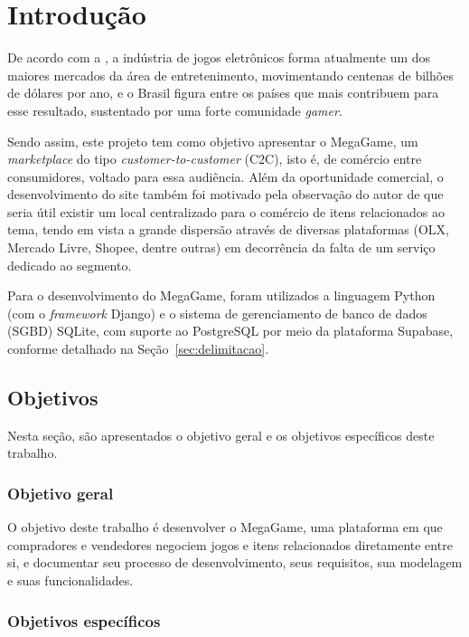\documentclass[
  12pt,
  a4paper,
  oneside,
  chapter=TITLE,
  subsection=TITLE,
  sumario=abnt-6027-2012,
  english,
  brazil
]{abntex2}
\begin{document}
\chapter{Introdução}

De acordo com a , a indústria de jogos
eletrônicos forma atualmente um dos maiores mercados da área de
entretenimento, movimentando centenas de bilhões de dólares por ano, e
o Brasil figura entre os países que mais contribuem para esse
resultado, sustentado por uma forte comunidade \emph{gamer}.

Sendo assim, este projeto tem como objetivo apresentar o MegaGame, um
\emph{marketplace} do tipo \emph{customer-to-customer} (C2C), isto é, de
comércio entre consumidores, voltado para essa audiência.
Além da oportunidade comercial, o desenvolvimento do site também foi
motivado pela observação do autor de que seria útil existir um local
centralizado para o comércio de itens relacionados ao tema, tendo em
vista a grande dispersão através de diversas plataformas (OLX, Mercado
Livre, Shopee, dentre outras) em decorrência da falta de um serviço
dedicado ao segmento.

Para o desenvolvimento do MegaGame, foram utilizados a linguagem Python
(com o \emph{framework} Django) e o sistema de gerenciamento de banco de
dados (SGBD) SQLite, com suporte ao PostgreSQL por meio da plataforma
Supabase, conforme detalhado na Seção~\ref{sec:delimitacao}.

\section{Objetivos}

Nesta seção, são apresentados o objetivo geral e os objetivos
específicos deste trabalho.

\subsection{Objetivo geral}

O objetivo deste trabalho é desenvolver o MegaGame, uma plataforma em
que compradores e vendedores negociem jogos e itens relacionados
diretamente entre si, e documentar seu processo de desenvolvimento, seus
requisitos, sua modelagem e suas funcionalidades.

\subsection{Objetivos específicos}
\end{document}
